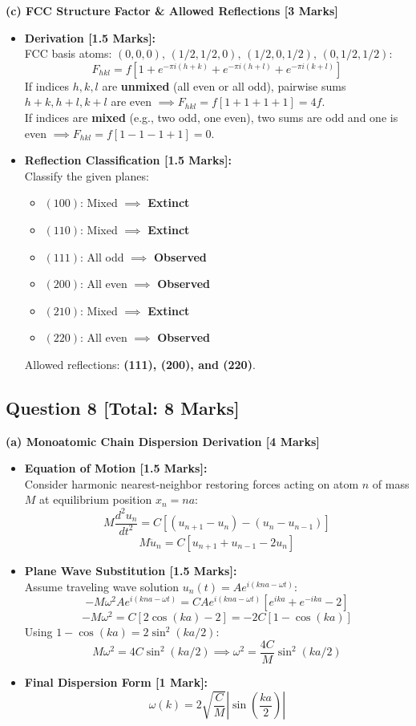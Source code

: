 \documentclass[10pt,a4paper,twocolumn]{article}
\begin{document}
\textbf{(c) FCC Structure Factor \& Allowed Reflections [3 Marks]}
\begin{itemize}
    \item \textbf{Derivation [1.5 Marks]:}\\
    FCC basis atoms: $(0,0,0),\, (1/2,1/2,0),\, (1/2,0,1/2),\, (0,1/2,1/2)$:
    $$F_{hkl} = f \left[1 + e^{-\pi i(h+k)} + e^{-\pi i(h+l)} + e^{-\pi i(k+l)}\right]$$
    If indices $h, k, l$ are \textbf{unmixed} (all even or all odd), pairwise sums $h+k, h+l, k+l$ are even $\implies F_{hkl} = f[1+1+1+1] = 4f$.\\[2pt]
    If indices are \textbf{mixed} (e.g., two odd, one even), two sums are odd and one is even $\implies F_{hkl} = f[1 - 1 - 1 + 1] = 0$.
    \item \textbf{Reflection Classification [1.5 Marks]:}\\
    Classify the given planes:
    \begin{itemize}
        \item $(100)$: Mixed $\implies$ \textbf{Extinct}
        \item $(110)$: Mixed $\implies$ \textbf{Extinct}
        \item $(111)$: All odd $\implies$ \textbf{Observed}
        \item $(200)$: All even $\implies$ \textbf{Observed}
        \item $(210)$: Mixed $\implies$ \textbf{Extinct}
        \item $(220)$: All even $\implies$ \textbf{Observed}
    \end{itemize}
    Allowed reflections: \textbf{(111), (200), and (220)}.
\end{itemize}

\subsection*{Question 8 [Total: 8 Marks]}
\textbf{(a) Monoatomic Chain Dispersion Derivation [4 Marks]}
\begin{itemize}
    \item \textbf{Equation of Motion [1.5 Marks]:}\\
    Consider harmonic nearest-neighbor restoring forces acting on atom $n$ of mass $M$ at equilibrium position $x_n = na$:
    $$M \frac{d^2 u_n}{dt^2} = C \left[(u_{n+1} - u_n) - (u_n - u_{n-1})\right]$$
    $$M \ddot{u}_n = C [u_{n+1} + u_{n-1} - 2u_n]$$
    \item \textbf{Plane Wave Substitution [1.5 Marks]:}\\
    Assume traveling wave solution $u_n(t) = A e^{i(kna - \omega t)}$:
    $$-M\omega^2 A e^{i(kna-\omega t)} = C A e^{i(kna-\omega t)} \left[e^{ika} + e^{-ika} - 2\right]$$
    $$-M\omega^2 = C [2\cos(ka) - 2] = -2C [1 - \cos(ka)]$$
    Using $1 - \cos(ka) = 2\sin^2(ka/2)$:
    $$M\omega^2 = 4C \sin^2(ka/2) \implies \omega^2 = \frac{4C}{M}\sin^2(ka/2)$$
    \item \textbf{Final Dispersion Form [1 Mark]:}
    $$\omega(k) = 2\sqrt{\frac{C}{M}}\left|\sin\left(\frac{ka}{2}\right)\right|$$
\end{itemize}
\end{document}

